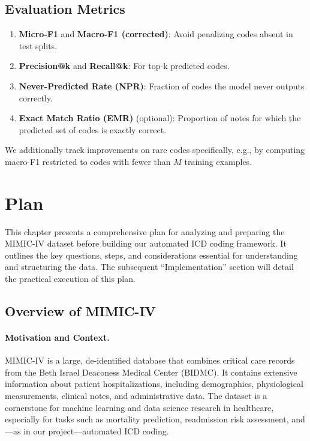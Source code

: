 \subsection{Evaluation Metrics}
\begin{enumerate}
    \item \textbf{Micro-F1} and \textbf{Macro-F1 (corrected)}: Avoid penalizing codes absent in test splits.
    \item \textbf{Precision@k} and \textbf{Recall@k}: For top-k predicted codes.
    \item \textbf{Never-Predicted Rate (NPR)}: Fraction of codes the model never outputs correctly.
    \item \textbf{Exact Match Ratio (EMR)} (optional): Proportion of notes for which the predicted set of codes is exactly correct.
\end{enumerate}
We additionally track improvements on rare codes specifically, e.g., by computing macro-F1 restricted to codes with fewer than $M$ training examples.




\section{Plan}

This chapter presents a comprehensive plan for analyzing and preparing the MIMIC-IV dataset before building our automated ICD coding framework. It outlines the key questions, steps, and considerations essential for understanding and structuring the data. The subsequent “Implementation” section will detail the practical execution of this plan.

\subsection{Overview of MIMIC-IV}

\paragraph{Motivation and Context.}
MIMIC-IV is a large, de-identified database that combines critical care records from the Beth Israel Deaconess Medical Center (BIDMC). It contains extensive information about patient hospitalizations, including demographics, physiological measurements, clinical notes, and administrative data. The dataset is a cornerstone for machine learning and data science research in healthcare, especially for tasks such as mortality prediction, readmission risk assessment, and—as in our project—automated ICD coding.

